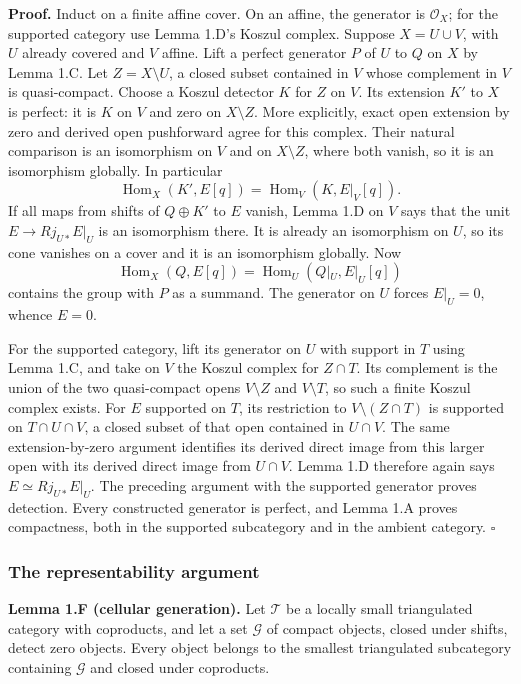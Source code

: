 \documentclass[11pt]{article}
\begin{document}
\textbf{Proof.} Induct on a finite affine cover. On an affine, the
generator is \(\mathcal O_X\); for the supported category use Lemma
1.D's Koszul complex. Suppose \(X=U\cup V\), with \(U\) already covered
and \(V\) affine. Lift a perfect generator \(P\) of \(U\) to \(Q\) on
\(X\) by Lemma 1.C. Let \(Z=X\setminus U\), a closed subset contained in
\(V\) whose complement in \(V\) is quasi-compact. Choose a Koszul
detector \(K\) for \(Z\) on \(V\). Its extension \(K'\) to \(X\) is
perfect: it is \(K\) on \(V\) and zero on \(X\setminus Z\). More
explicitly, exact open extension by zero and derived open pushforward
agree for this complex. Their natural comparison is an isomorphism on
\(V\) and on \(X\setminus Z\), where both vanish, so it is an
isomorphism globally. In particular \[
\operatorname{Hom}_X(K',E[q])=\operatorname{Hom}_V(K,E|_V[q]).
\] If all maps from shifts of \(Q\oplus K'\) to \(E\) vanish, Lemma 1.D
on \(V\) says that the unit \(E\to Rj_{U*}E|_U\) is an isomorphism
there. It is already an isomorphism on \(U\), so its cone vanishes on a
cover and it is an isomorphism globally. Now \[
\operatorname{Hom}_X(Q,E[q])=
\operatorname{Hom}_U(Q|_U,E|_U[q])
\] contains the group with \(P\) as a summand. The generator on \(U\)
forces \(E|_U=0\), whence \(E=0\).

For the supported category, lift its generator on \(U\) with support in
\(T\) using Lemma 1.C, and take on \(V\) the Koszul complex for
\(Z\cap T\). Its complement is the union of the two quasi-compact opens
\(V\setminus Z\) and \(V\setminus T\), so such a finite Koszul complex
exists. For \(E\) supported on \(T\), its restriction to
\(V\setminus(Z\cap T)\) is supported on \(T\cap U\cap V\), a closed
subset of that open contained in \(U\cap V\). The same extension-by-zero
argument identifies its derived direct image from this larger open with
its derived direct image from \(U\cap V\). Lemma 1.D therefore again
says \(E\simeq Rj_{U*}E|_U\). The preceding argument with the supported
generator proves detection. Every constructed generator is perfect, and
Lemma 1.A proves compactness, both in the supported subcategory and in
the ambient category. \(\square\)

\subsubsection{The representability
argument}\label{the-representability-argument}

\textbf{Lemma 1.F (cellular generation).} Let \(\mathcal T\) be a
locally small triangulated category with coproducts, and let a set
\(\mathcal G\) of compact objects, closed under shifts, detect zero
objects. Every object belongs to the smallest triangulated subcategory
containing \(\mathcal G\) and closed under coproducts.
\end{document}
